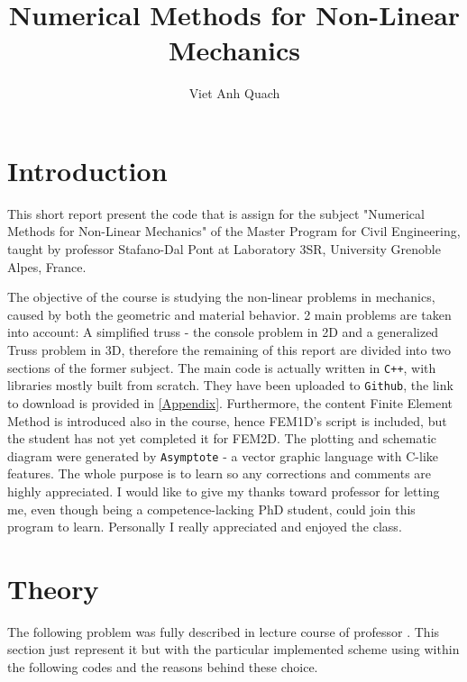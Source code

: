 \documentclass[a4paper,12pt]{article}
\title{\textbf{Numerical Methods for Non-Linear Mechanics}}
\author{Viet Anh Quach}
\date{} %
\numberwithin{equation}{section}
\theoremstyle{remark}
\begin{document}
\maketitle




\section{Introduction}
This short report present the code that is assign for the subject "Numerical Methods for Non-Linear Mechanics" of the Master Program for Civil Engineering, taught by professor Stafano-Dal Pont at Laboratory 3SR, University Grenoble Alpes, France.


The objective of the course is studying the non-linear problems in mechanics, caused by both the geometric and material behavior.
2 main problems are taken into account: A simplified truss - the console problem in 2D and a generalized Truss problem in 3D, therefore the remaining of this report are divided into two sections of the former subject. 
The main code is actually written in \texttt{C++}, with libraries mostly built from scratch. They have been uploaded to \texttt{Github}, the link to download is provided in \cref{Appendix}. 
Furthermore, the content Finite Element Method is introduced also in the course, hence FEM1D's script is included, but the student has not yet completed it for FEM2D.
The plotting and schematic diagram were generated by \texttt{Asymptote} - a vector graphic language with C-like features. The whole purpose is to learn so any corrections and comments are highly appreciated.
I would like to give my thanks toward professor for letting me, even though being a competence-lacking PhD student, could join this program to learn. Personally I really appreciated and enjoyed the class.

\section{Theory}
The following problem was fully described in lecture course \citep{dalpont2020_nonlinear_mech} of professor \citeauthor{dalpont2020_nonlinear_mech}.
This section just represent it but with the particular implemented scheme using within the following codes and the reasons behind these choice.
\end{document}
